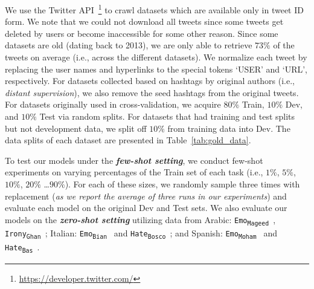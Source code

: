 We use the Twitter API~\footnote{\url{https://developer.twitter.com/}} to crawl datasets which are available only in tweet ID form. We note that we could not download all tweets since some tweets get deleted by users or become inaccessible for some other reason. Since some datasets are old (dating back to 2013), we are only able to retrieve $73\%$ of the tweets on average (i.e., across the different datasets). %
We normalize each tweet by replacing the user names and hyperlinks to the special tokens `USER' and `URL', respectively. %
For datasets collected based on hashtags by original authors (i.e., \textit{distant supervision}), we also remove the seed hashtags from the original tweets. For datasets originally used in cross-validation, we acquire $80\%$ Train, $10\%$ Dev, and $10\%$ Test via random splits. For datasets that had training and test splits but not development data, we split off $10\%$ from training data into Dev. The data splits of each dataset are presented in Table~\ref{tab:gold_data}. %


To test our models under the \textbf{\textit{few-shot setting}}, we conduct few-shot experiments on varying percentages of the Train set of each task (i.e., $1\%$, $5\%$, $10\%$, $20\%$ \dots $90\%$). For each of these sizes, we randomly sample three times with replacement (\textit{as we report the average of three runs in our experiments}) and evaluate each model on the original Dev and Test sets. We also evaluate our models on the \textbf{\textit{zero-shot setting}} utilizing data from Arabic: \texttt{Emo\textsubscript{Mageed}}~\cite{mageed-2020-aranet}, \texttt{Irony\textsubscript{Ghan}}~\cite{idat2019}; Italian: \texttt{Emo\textsubscript{Bian}}~\cite{bianchi2021feel} and \texttt{Hate\textsubscript{Bosco}}~\cite{bosco2018overview}; and Spanish:    \texttt{Emo\textsubscript{Moham}}~\cite{mohammad-2018-semeval} and \texttt{Hate\textsubscript{Bas}}~\cite{basile-2019-semeval}. %



  
 
